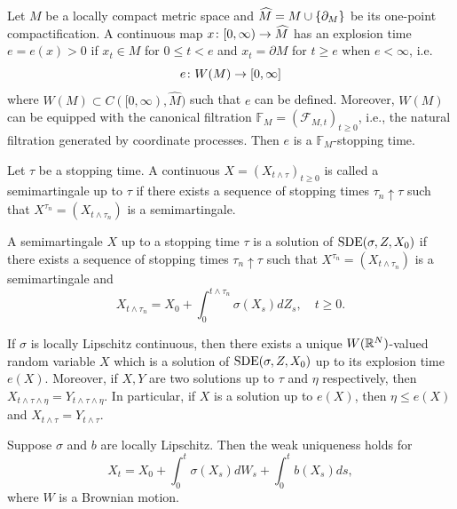 Let $M$ be a locally compact metric space and $\widehat{M} = M \cup \left\{\partial_M\right\}$ be its one-point compactification. A continuous map $x \colon [0,\infty) \rightarrow \widehat{M}$ has an explosion time $e = e(x) > 0$ if $x_t \in M$ for $0 \leq t < e$ and $x_t = \partial M$ for $t \geq e$ when $e < \infty$, i.e.
\begin{equation*}
	e \colon W(M) \rightarrow [0,\infty]
\end{equation*}
where $W(M) \subset C([0,\infty),\widehat{M})$ such that $e$ can be defined. Moreover, $W(M)$ can be equipped with the canonical filtration $\mathbb{F}_M = (\mathcal{F}_{M,t})_{t \geq 0}$, i.e., the natural filtration generated by coordinate processes. Then $e$ is a $\mathbb{F}_M$-stopping time.

\begin{defn}
    Let $\tau$ be a stopping time. A continuous $X = (X_{t \wedge \tau})_{t \geq 0}$ is called a semimartingale up to $\tau$ if there exists a sequence of stopping times $\tau_n \uparrow \tau$ such that $X^{\tau_n} = (X_{t \wedge \tau_n})$ is a semimartingale.
\end{defn}

\begin{defn}
    A semimartingale $X$ up to a stopping time $\tau$ is a solution of $\operatorname{SDE}(\sigma,Z,X_0)$ if there exists a sequence of stopping times $\tau_n \uparrow \tau$ such that $X^{\tau_n} = (X_{t \wedge \tau_n})$ is a semimartingale and
    \begin{equation*}
     	X_{t \wedge \tau_n}=X_0+\int_0^{t \wedge \tau_n} \sigma\left(X_s\right) d Z_s, \quad t \geq 0.
    \end{equation*} 
\end{defn}

\begin{thm}
    If $\sigma$ is locally Lipschitz continuous, then there exists a unique $W(\mathbb{R}^N)$-valued random variable $X$ which is a solution of $\operatorname{SDE}(\sigma,Z,X_0)$ up to its explosion time $e(X)$. Moreover, if $X,Y$ are two solutions up to $\tau$ and $\eta$ respectively, then $X_{t \wedge \tau \wedge \eta} = Y_{t \wedge \tau \wedge \eta}$. In particular, if $X$ is a solution up to $e(X)$, then $\eta \leq e(X)$ and $X_{t \wedge \tau} = Y_{t \wedge \tau}$.
\end{thm}

\begin{thm}
    Suppose $\sigma$ and $b$ are locally Lipschitz. Then the weak uniqueness holds for
    \begin{equation*}
    	X_t = X_0 + \int_0^t \sigma(X_s) dW_s + \int_0^t b(X_s)ds,
    \end{equation*}
    where $W$ is a Brownian motion.
\end{thm}

